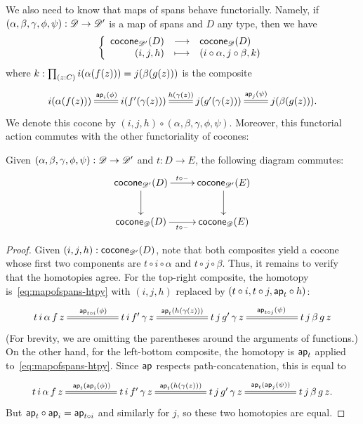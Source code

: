 We also need to know that maps of spans behave functorially.
Namely, if $(\alpha,\beta,\gamma,\phi,\psi):\mathscr{D} \to \mathscr{D}'$ is a map of spans and $D$ any type, then we have
\[ \left\{\begin{array}{rcl}\mathsf{cocone}_{\mathscr{D}'}(D) & \longrightarrow & \mathsf{cocone}_{\mathscr{D}}(D) \\ (i,j,h) & \longmapsto & (i\circ \alpha,j\circ\beta, k) \end{array}\right. \]
where $k: \prd{z:C} i(\alpha(f(z))) = j(\beta(g(z)))$ is the composite
\begin{equation}\label{eq:mapofspans-htpy}
\xymatrix{
  i(\alpha(f(z))) \ar@{=}[r]^{\apfunc{i}(\phi)} &
  i(f'(\gamma(z))) \ar@{=}[r]^{h(\gamma(z))} &
  j(g'(\gamma(z))) \ar@{=}[r]^{\apfunc{j}(\psi)} &
  j(\beta(g(z))). }
\end{equation}
We denote this cocone by $(i,j,h) \circ (\alpha,\beta,\gamma,\phi,\psi)$.
Moreover, this functorial action commutes with the other functoriality of cocones:

\begin{lem}\label{thm:conemap-funct}
  Given $(\alpha,\beta,\gamma,\phi,\psi):\mathscr{D} \to \mathscr{D}'$ and $t:D\to E$, the following diagram commutes:
  \begin{equation*}
    \vcenter{\xymatrix{
        \cocone{\Ddiag'}{D}\ar[r]^{t \circ {\blank}}\ar[d] &
        \cocone{\Ddiag'}{E}\ar[d]\\
        \cocone{\Ddiag}{D}\ar[r]_{t \circ {\blank}} &
        \cocone{\Ddiag}{E}
      }}
  \end{equation*}
\end{lem}
\begin{proof}
  Given $(i,j,h):\mathsf{cocone}_{\mathscr{D}'}(D)$, note that both composites yield a cocone whose first two components are $t\circ i\circ \alpha$ and $t\circ j\circ\beta$.
  Thus, it remains to verify that the homotopies agree.
  For the top-right composite, the homotopy is~\eqref{eq:mapofspans-htpy} with $(i,j,h)$ replaced by $(t\circ i, t\circ j, \mathsf{ap}_{t}\circ h)$:
  \begin{equation*}
    \xymatrix@+2.8em{
      {t \, i \, \alpha \, f \, z} \ar@{=}[r]^{\apfunc{t\circ i}(\phi)} &
      {t \, i \, f' \, \gamma \, z} \ar@{=}[r]^{\apfunc{t}(h(\gamma(z)))} &
      {t \, j \, g' \, \gamma \, z} \ar@{=}[r]^{\apfunc{t\circ j}(\psi)} &
      {t \, j \, \beta \, g \, z}
    }
  \end{equation*}
  (For brevity, we are omitting the parentheses around the arguments of functions.)
  On the other hand, for the left-bottom composite, the homotopy is $\mathsf{ap}_{t}$ applied to~\eqref{eq:mapofspans-htpy}.
  Since $\mathsf{ap}_{}$ respects path-concatenation, this is equal to
  \begin{equation*}
    \xymatrix@+2.8em{
      {t \, i \, \alpha \, f \, z} \ar@{=}[r]^{\apfunc{t}(\apfunc{i}(\phi))} &
      {t \, i \, f' \, \gamma \, z} \ar@{=}[r]^{\apfunc{t}(h(\gamma(z)))} &
      {t \, j \, g' \, \gamma \, z} \ar@{=}[r]^{\apfunc{t}(\apfunc{j}(\psi))} &
      {t \, j \, \beta \, g \, z}. }
  \end{equation*}
  But $\mathsf{ap}_{t}\circ \mathsf{ap}_{i} = \mathsf{ap}_{t\circ i}$ and similarly for $j$, so these two homotopies are equal.
\end{proof}

